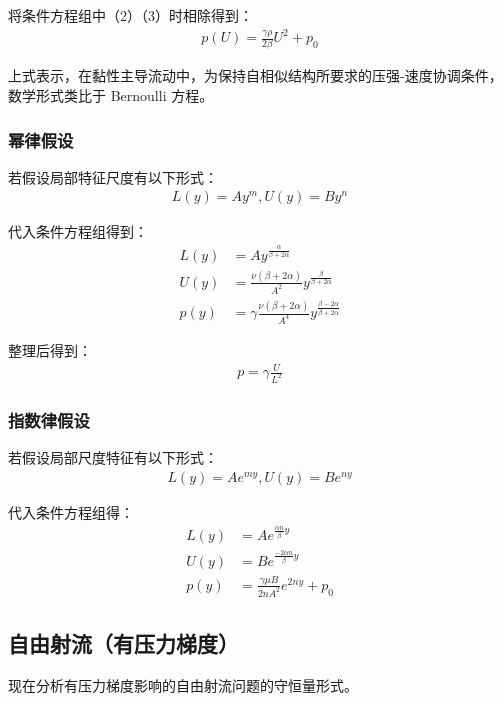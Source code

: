 将条件方程组中（2）（3）时相除得到：
\begin{align}
    p(U)=\frac{\gamma \rho}{2\beta}U^{2}+p_{0}
\end{align}

上式表示，在黏性主导流动中，为保持自相似结构所要求的压强-速度协调条件，数学形式类比于 Bernoulli 方程。

\subsubsection{幂律假设}
若假设局部特征尺度有以下形式：
\begin{align}
    L(y)=Ay^{m},U(y)=By^{n}
\end{align}

代入条件方程组得到：
\begin{align}
    L(y)&=Ay^{\frac{\alpha}{\beta+2\alpha}}\\
    U(y)&=\frac{\nu(\beta+2\alpha)}{A^{2}}y^{\frac{\beta}{\beta+2\alpha}}\\
    p(y)&=\gamma\frac{\nu(\beta+2\alpha)}{A^{4}}y^{\frac{\beta-2\alpha}{\beta+2\alpha}}
\end{align}

整理后得到：
\begin{align}
    p=\gamma \frac{U}{L^{2}}
\end{align}

\subsubsection{指数律假设}
若假设局部尺度特征有以下形式：
\begin{align}
    L(y)=Ae^{my},U(y)=Be^{ny}
\end{align}

代入条件方程组得：
\begin{align}
    L(y)&=Ae^{\frac{\alpha n}{\beta}y}\\
    U(y)&=Be^{\frac{-2\alpha n}{\beta}y}\\
    p(y)&=\frac{\gamma \mu B}{2nA^{2}}e^{2ny}+p_{0}
\end{align}

\subsection{自由射流（有压力梯度）}
现在分析有压力梯度影响的自由射流问题的守恒量形式。

